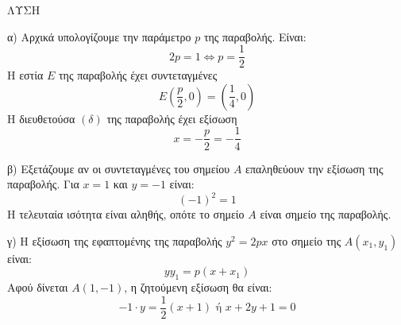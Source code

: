 ΛΥΣΗ

α) Αρχικά υπολογίζουμε την παράμετρο $p$ της παραβολής. Είναι:
\[ 2p = 1 \Leftrightarrow p = \frac{1}{2} \]
Η εστία $E$ της παραβολής έχει συντεταγμένες
\[ E\left(\frac{p}{2}, 0\right) = \left(\frac{1}{4}, 0\right) \]
Η διευθετούσα $(\delta)$ της παραβολής έχει εξίσωση
\[ x = -\frac{p}{2} = -\frac{1}{4} \]

β) Εξετάζουμε αν οι συντεταγμένες του σημείου $A$ επαληθεύουν την εξίσωση της παραβολής. Για $x=1$ και $y=-1$ είναι:
\[ (-1)^2 = 1 \]
Η τελευταία ισότητα είναι αληθής, οπότε το σημείο $A$ είναι σημείο της παραβολής.

γ) Η εξίσωση της εφαπτομένης της παραβολής $y^2 = 2px$ στο σημείο της $A(x_1,y_1)$ είναι:
\[ yy_1 = p(x + x_1) \]
Αφού δίνεται $A(1,-1)$, η ζητούμενη εξίσωση θα είναι:
\[ -1 \cdot y = \frac{1}{2}(x + 1) \text{ ή } x + 2y + 1 = 0 \]

\endlysh{}